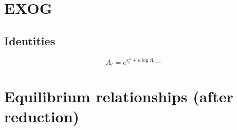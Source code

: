 \section{EXOG}

\subsection{Identities}

\begin{equation}
A_{t} = e^{\epsilon^{\mathrm{A}}_{t} + {\rho} {\log{A_{t-1}}}}
\end{equation}




\section{Equilibrium relationships (after reduction)}

